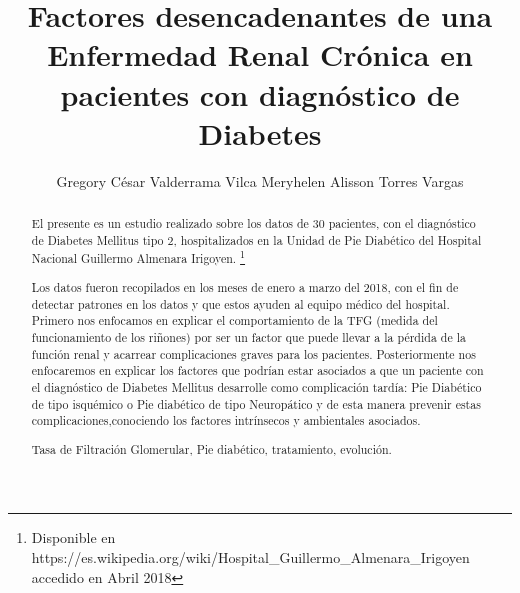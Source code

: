 \documentclass[runningheads,a4paper]{llncs}
\newcommand{\keywords}[1]{\par\addvspace\baselineskip
\noindent\keywordname\enspace\ignorespaces#1}
\begin{document}
\title{Factores desencadenantes de una  Enfermedad Renal Crónica en pacientes con diagnóstico de Diabetes}


\author{Gregory César Valderrama Vilca Meryhelen Alisson Torres Vargas}





\toctitle{} \tocauthor{}

\maketitle

%
%
%
%
\begin{abstract}

El presente es un estudio realizado sobre los datos de 30 pacientes, con el diagnóstico de Diabetes Mellitus tipo 2, hospitalizados en la Unidad de Pie Diabético del Hospital Nacional Guillermo Almenara Irigoyen. \footnote{Disponible en https://es.wikipedia.org/wiki/Hospital\_Guillermo\_Almenara\_Irigoyen accedido en Abril 2018 }

Los datos fueron recopilados en los meses de enero a marzo del 2018, con el fin de detectar patrones en los datos y que estos ayuden al equipo médico del hospital. Primero nos enfocamos en explicar el comportamiento de la \ac{TFG} (medida del funcionamiento de los riñones) por ser un factor que puede llevar a la pérdida de la función renal y acarrear complicaciones graves para los pacientes. Posteriormente nos enfocaremos en explicar los factores que podrían estar asociados a que  un paciente con el diagnóstico de Diabetes Mellitus  desarrolle como complicación tardía: Pie Diabético de  tipo isquémico o Pie diabético de tipo Neuropático y de esta manera prevenir estas complicaciones,conociendo los factores intrínsecos y ambientales asociados. 


\keywords{ Tasa de Filtración Glomerular, Pie diabético, tratamiento, evolución.}

\end{abstract}
\end{document}
